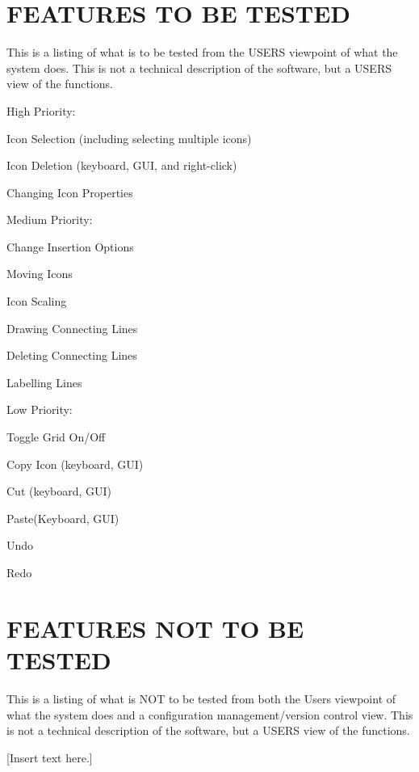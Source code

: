 \documentclass[twoside,letterpaper]{article}
\begin{document}
\section[FEATURES TO BE TESTED]{\bfseries\color{black} FEATURES TO BE TESTED}
{\itshape\color{black}

This is a listing of what is to be tested from the USERS viewpoint of
what the system does. This is not a technical description of the
software, but a USERS view of the functions.

}
{\color{black}
\begin{list}{-}{ }
\item High Priority:
\begin{list}{-}{ }
\item Icon Selection (including selecting multiple icons)
\item Icon Deletion (keyboard, GUI, and right-click)
\item Changing Icon Properties
\end{list}
\item Medium Priority:
\begin{list}{-}{ }
\item Change Insertion Options
\item Moving Icons
\item Icon Scaling
\item Drawing Connecting Lines
\item Deleting Connecting Lines
\item Labelling Lines
\end{list}
\item Low Priority:
\begin{list}{-}{ }
\item Toggle Grid On/Off
\item Copy Icon (keyboard, GUI)
\item Cut (keyboard, GUI)
\item Paste(Keyboard, GUI)
\item Undo
\item Redo
\end{list}
\end{list}
}

\section[FEATURES NOT TO BE TESTED]{\bfseries\color{black}
	 FEATURES NOT TO BE TESTED}
{\itshape\color{black}

This is a listing of what is NOT to be tested from both the Users
viewpoint of what the system does and a configuration
management/version control view. This is not a technical description
of the software, but a USERS view of the functions.

}
{\color{black}
[Insert text here.]}
\end{document}
